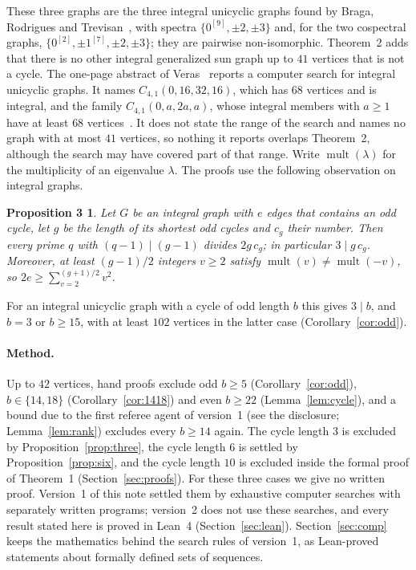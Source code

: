 \documentclass[11pt]{article}
\newtheorem*{propthree}{Proposition 3}
\theoremstyle{definition}
\theoremstyle{remark}
\DeclareMathOperator{\mult}{mult}
\begin{document}
These three graphs are the three integral unicyclic graphs found by Braga,
Rodrigues and Trevisan~\cite[Section~5, p.~296, and Table~1, p.~297]{brt}, with
spectra $\{0^{[9]},\pm2,\pm3\}$ and, for the two cospectral graphs,
$\{0^{[2]},\pm1^{[7]},\pm2,\pm3\}$; they are pairwise non-isomorphic.
Theorem~2 adds that there is no other integral generalized sun graph up to
$41$ vertices that is not a cycle. The one-page abstract of
Veras~\cite{ver} reports a computer search for integral unicyclic graphs. It
names $C_{4,1}(0,16,32,16)$, which has $68$ vertices and is integral, and the
family $C_{4,1}(0,a,2a,a)$, whose integral members with $a\ge1$ have at least
$68$ vertices~\cite{bms}. It does not state the range of the search and names no
graph with at most $41$ vertices, so nothing it reports overlaps Theorem~2,
although the search may have covered part of that range. Write $\mult(\lambda)$ for
the multiplicity of an eigenvalue $\lambda$. The proofs use the following
observation on integral graphs.

\begin{propthree}
Let $G$ be an integral graph with $e$ edges that contains an odd cycle, let $g$
be the length of its shortest odd cycles and $c_g$ their number. Then every
prime $q$ with $(q-1)\mid(g-1)$ divides $2g\,c_g$; in particular $3\mid g\,c_g$.
Moreover, at least $(g-1)/2$ integers $v\ge2$ satisfy $\mult(v)\ne\mult(-v)$,
so $2e\ge\sum_{v=2}^{(g+1)/2}v^2$.
\end{propthree}

For an integral unicyclic graph with a cycle of odd length $b$ this gives
$3\mid b$, and $b=3$ or $b\ge15$, with at least $102$ vertices in the latter
case (Corollary~\ref{cor:odd}).

\paragraph{Method.}
Up to $42$ vertices, hand proofs exclude odd $b\ge5$
(Corollary~\ref{cor:odd}), $b\in\{14,18\}$ (Corollary~\ref{cor:1418}) and even
$b\ge22$ (Lemma~\ref{lem:cycle}), and a bound due to the first referee agent of
version~1 (see the disclosure; Lemma~\ref{lem:rank}) excludes every $b\ge14$
again. The cycle length $3$ is excluded by Proposition~\ref{prop:three}, the
cycle length $6$ is settled by Proposition~\ref{prop:six}, and the cycle length
$10$ is excluded inside the formal proof of Theorem~1
(Section~\ref{sec:proofs}). For these three cases we give no written proof.
Version~1 of this note settled them by exhaustive computer searches with
separately written programs; version~2 does not use these searches, and every
result stated here is proved in Lean~4 (Section~\ref{sec:lean}).
Section~\ref{sec:comp} keeps the mathematics behind the search rules of
version~1, as Lean-proved statements about formally defined sets of
sequences.
\end{document}
